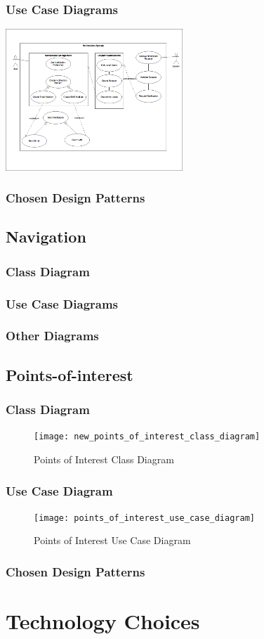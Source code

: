 \documentclass{article}
\begin{document}
        \subsubsection{Use Case Diagrams}
    			\includegraphics[width=0.5\textwidth]{NotificationUseCases}	
        \subsubsection{Chosen Design Patterns}
    \subsection{Navigation}
        \subsubsection{Class Diagram}
        \subsubsection{Use Case Diagrams}
        \subsubsection{Other Diagrams}
    \subsection{Points-of-interest}
        \subsubsection{Class Diagram}
	  \begin{figure} [!h]
            \centering
            \texttt{[image: new\_points\_of\_interest\_class\_diagram]}
            \caption{Points of Interest Class Diagram}
            \label{Points of Interest Class Diagram}
        \end{figure}
        \subsubsection{Use Case Diagram}
	 \begin{figure} [!h]
            \centering
            \texttt{[image: points\_of\_interest\_use\_case\_diagram]}
            \caption{Points of Interest Use Case Diagram}
            \label{Points of Interest Use Case Diagram}
        \end{figure}
        \subsubsection{Chosen Design Patterns}
\section{Technology Choices}

\end{document}
